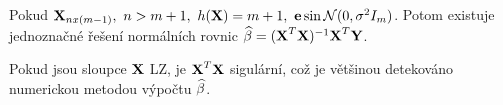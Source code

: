 \begin{remark}
	Pokud $\textbf{X}_{nx(m-1)},~n>m+1,~h(\textbf{X})=m+1,~\textbf{e}\sin\mathcal{N}(0,\sigma^2 I_m)$. Potom existuje jednoznačné řešení normálních rovnic $\widehat{\beta}=(\textbf{X}^T\textbf{X})^{-1}\textbf{X}^T\textbf{Y}$.
\end{remark}
\begin{remark}
	Pokud jsou sloupce $\textbf{X}$ LZ, je $\textbf{X}^T\textbf{X}$ sigulární, což je většinou detekováno numerickou metodou výpočtu $\widehat{\beta}$.
\end{remark}